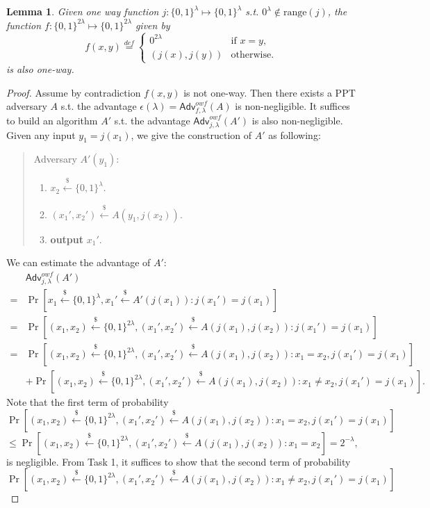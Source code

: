 \documentclass[12pt]{article}
\newcommand{\eqdef}{\stackrel{def}{=}}
\newcommand{\bits}{\{0,1\}}
\newcommand{\getsr}{\stackrel{\$}{\gets}}
\newcommand{\Adv}{\textsf{Adv}}
\newtheorem{lemma}[theorem]{Lemma}
\theoremstyle{definition}
\begin{document}
\begin{lemma}
Given one way function $j : \bits^\lambda \mapsto \bits^\lambda$ s.t. $0^\lambda \not\in \mathrm{range}(j)$, the function $f : \bits^{2\lambda} \mapsto \bits^{2\lambda}$ given by
$$f(x,y) \eqdef
\begin{cases}
0^{2\lambda} & \textrm{if $x=y$,} \\
(j(x),j(y)) & \textrm{otherwise.}
\end{cases}$$
is also one-way.
\end{lemma}
\begin{proof}
Assume by contradiction $f(x,y)$ is not one-way. Then there exists a PPT adversary $A$ s.t. the advantage $\epsilon(\lambda) = \Adv_{f,\lambda}^{owf}(A)$ is non-negligible. It suffices to build an algorithm $A'$ s.t. the advantage $\Adv_{j,\lambda}^{owf}(A')$ is also non-negligible. Given any input $y_1 = j(x_1)$, we give the construction of $A'$ as following:
\begin{quote}
Adversary $A' (y_1)$:
\begin{enumerate}
\item $x_2 \getsr \bits^\lambda$.
\item $(x_1',x_2') \getsr A(y_1,j(x_2))$.
\item {\bf output} $x_1'$.
\end{enumerate}
\end{quote} 
We can estimate the advantage of $A'$:
$$
\begin{aligned}
&\Adv_{j,\lambda}^{owf}(A') \\
=& \Pr[x_1 \getsr \bits^\lambda, x_1' \getsr A'(j(x_1)) : j(x_1') = j(x_1)] \\
=& \Pr[(x_1, x_2) \getsr \bits^{2\lambda}, (x_1', x_2') \getsr A(j(x_1),j(x_2)) : j(x_1') = j(x_1)] \\
=& \Pr[(x_1, x_2) \getsr \bits^{2\lambda}, (x_1', x_2') \getsr A(j(x_1),j(x_2)) : x_1=x_2, j(x_1') = j(x_1)] \\
&+\Pr[(x_1, x_2) \getsr \bits^{2\lambda}, (x_1', x_2') \getsr A(j(x_1),j(x_2)) : x_1\not=x_2, j(x_1') = j(x_1)].
\end{aligned}
$$
Note that the first term of probability 
$$\Pr[(x_1, x_2) \getsr \bits^{2\lambda}, (x_1', x_2') \getsr A(j(x_1),j(x_2)) : x_1=x_2, j(x_1') = j(x_1)]$$
$$\leq \Pr[(x_1, x_2) \getsr \bits^{2\lambda}, (x_1', x_2') \getsr A(j(x_1),j(x_2)) : x_1=x_2] = 2^{-\lambda},$$
is negligible. From Task 1, it suffices to show that the second term of probability
$$\Pr[(x_1, x_2) \getsr \bits^{2\lambda}, (x_1', x_2') \getsr A(j(x_1),j(x_2)) : x_1\not=x_2, j(x_1') = j(x_1)]$$

\end{proof}
\end{document}
